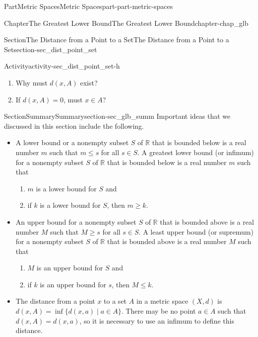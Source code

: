 \documentclass[oneside,10pt,]{book}
\numberwithin{equation}{chapter}
\newcommand{\R}{\mathbb{R}}
\begin{document}
\begin{partptx}{Part}{Metric Spaces}{}{Metric Spaces}{}{}{part-part-metric-spaces}
\begin{chapterptx}{Chapter}{The Greatest Lower Bound}{}{The Greatest Lower Bound}{}{}{chapter-chap_glb}
\begin{sectionptx}{Section}{The Distance from a Point to a Set}{}{The Distance from a Point to a Set}{}{}{section-sec_dist_point_set}
\begin{activity}{Activity}{}{activity-sec_dist_point_set-h}
\begin{enumerate}[font=\bfseries,label=(\alph*),ref=\alph*]%
\item{}Why must \(d(x,A)\) exist?%
\item{}If \(d(x,A) = 0\), must \(x \in A\)?%
\end{enumerate}%
\end{activity}%
\end{sectionptx}
%
%
\typeout{************************************************}
\typeout{************************************************}
%
\begin{sectionptx}{Section}{Summary}{}{Summary}{}{}{section-sec_glb_summ}
Important ideas that we discussed in this section include the following.%
\begin{itemize}[label=\textbullet]
\item{}A lower bound or a nonempty subset \(S\) of \(\R\) that is bounded below is a real number \(m\) such that \(m \leq s\) for all \(s \in S\). A greatest lower bound (or infimum) for a nonempty subset \(S\) of \(\R\) that is bounded below is a real number \(m\) such that%
\begin{enumerate}[label=\roman*]
\item{}\(m\) is a lower bound for \(S\) and%
\item{}if \(k\) is a lower bound for \(S\), then \(m \geq k\).%
\end{enumerate}
%
\item{}An upper bound for a nonempty subset \(S\) of \(\R\) that is bounded above is a real number \(M\) such that \(M \geq s\) for all \(s \in S\). A least upper bound (or supremum) for a nonempty subset \(S\) of \(\R\) that is bounded above is a real number \(M\) such that%
\begin{enumerate}[label=\roman*]
\item{}\(M\) is an upper bound for \(S\) and%
\item{}if \(k\) is an upper bound for \(s\), then \(M \leq k\).%
\end{enumerate}
%
\item{}The distance from a point \(x\) to a set \(A\) in a metric space \((X,d)\) is \(d(x,A) = \inf \{d(x,a) \mid a \in A\}\). There may be no point \(a \in A\) such that \(d(x,A) = d(x,a)\), so it is necessary to use an infimum to define this distance.%
\end{itemize}
%
\end{sectionptx}
%
%
\typeout{************************************************}

\end{chapterptx}
\end{partptx}
\end{document}
